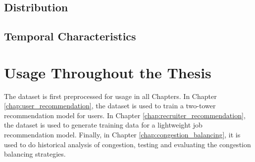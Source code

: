 \subsection{Distribution}
\subsection{Temporal Characteristics}

\section{Usage Throughout the Thesis}
\label{sec:dataset_usage}
The dataset is first preprocessed for usage in all Chapters. In Chapter \ref{chap:user_recommendation}, the dataset is used to train a two-tower recommendation model for users. In Chapter \ref{chap:recruiter_recommendation}, the dataset is used to generate training data for a lightweight job recommendation model. Finally, in Chapter \ref{chap:congestion_balancing}, it is used to do historical analysis of congestion, testing and evaluating the congestion balancing strategies.



